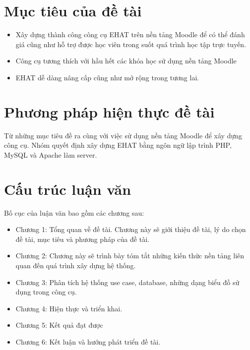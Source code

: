 \section{Mục tiêu của đề tài}
\begin{itemize}
	\item Xây dựng thành công công cụ EHAT trên nền tảng Moodle để có thể đánh giá cũng như hỗ trợ được học viên trong suốt quá trình học tập trực tuyến.
	\item Công cụ tương thích với hầu hết các khóa học sử dụng nền tảng Moodle
	\item EHAT dễ dàng nâng cấp cũng như mở rộng trong tương lai.
\end{itemize}

\section{Phương pháp hiện thực đề tài}
Từ những mục tiêu đề ra cùng với việc sử dụng nền tảng Moodle để xây dựng công cụ. Nhóm quyết định xây dựng EHAT bằng ngôn ngữ lập trình PHP, MySQL và Apache làm server.

\section{Cấu trúc luận văn}
Bố cục của luận văn bao gồm các chương sau:
\begin{itemize}
	\item Chương 1: Tổng quan về đề tài. Chương này sẽ giới thiệu đề tài, lý do chọn đề tài, mục tiêu và phương pháp của đề tài.
	\item Chương 2: Chương này sẽ trình bày tóm tắt những kiến thức nền tảng liên quan đến quá trình xây dựng hệ thống.
	\item Chương 3: Phân tích hệ thống use case, database, những dạng biểu đồ sử dụng trong công cụ.
	\item Chương 4: Hiện thực và triển khai.
	\item Chương 5: Kết quả đạt được
	\item Chương 6: Kết luận và hướng phát triển đề tài.
\end{itemize}